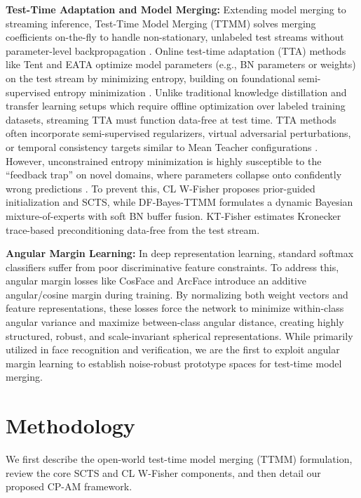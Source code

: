 \documentclass{article}
\theoremstyle{plain}
\theoremstyle{definition}
\theoremstyle{remark}
\begin{document}
\textbf{Test-Time Adaptation and Model Merging:} Extending model merging to streaming inference, Test-Time Model Merging (TTMM) solves merging coefficients on-the-fly to handle non-stationary, unlabeled test streams without parameter-level backpropagation \cite{yang2024test, hubotter2025coacting}. Online test-time adaptation (TTA) methods like Tent \cite{wang2021tent} and EATA \cite{niu2022efficient} optimize model parameters (e.g., BN parameters or weights) on the test stream by minimizing entropy, building on foundational semi-supervised entropy minimization \cite{grandvalet2004semi}. Unlike traditional knowledge distillation and transfer learning setups \cite{hinton2015distilling, romero2014fitnets, zagoruyko2016paying, yim2017gift} which require offline optimization over labeled training datasets, streaming TTA must function data-free at test time. TTA methods often incorporate semi-supervised regularizers, virtual adversarial perturbations, or temporal consistency targets similar to Mean Teacher configurations \cite{tarvainen2017mean, miyato2018virtual}. However, unconstrained entropy minimization is highly susceptible to the ``feedback trap'' on novel domains, where parameters collapse onto confidently wrong predictions \cite{dfbayes2025data}. To prevent this, CL W-Fisher \cite{hubotter2025coacting} proposes prior-guided initialization and SCTS, while DF-Bayes-TTMM \cite{dfbayes2025data} formulates a dynamic Bayesian mixture-of-experts with soft BN buffer fusion. KT-Fisher \cite{ktfisher2025kronecker} estimates Kronecker trace-based preconditioning data-free from the test stream.

\textbf{Angular Margin Learning:} In deep representation learning, standard softmax classifiers suffer from poor discriminative feature constraints. To address this, angular margin losses like CosFace \cite{wang2018cosface} and ArcFace \cite{deng2019arcface} introduce an additive angular/cosine margin during training. By normalizing both weight vectors and feature representations, these losses force the network to minimize within-class angular variance and maximize between-class angular distance, creating highly structured, robust, and scale-invariant spherical representations. While primarily utilized in face recognition and verification, we are the first to exploit angular margin learning to establish noise-robust prototype spaces for test-time model merging.

\section{Methodology}
\label{sec:method}
We first describe the open-world test-time model merging (TTMM) formulation, review the core SCTS and CL W-Fisher components, and then detail our proposed CP-AM framework.
\end{document}
